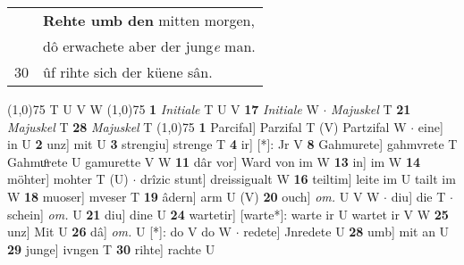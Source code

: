 \documentclass[8pt,a4paper,notitlepage]{article}
\begin{document}
\begin{table}[ht]
\begin{minipage}[t]{0.5\linewidth}
\begin{tabular}{rl}
 & \textbf{Rehte umb den} mitten morgen,\\ 
 & dô erwachete aber der jung\textit{e} man.\\ 
30 & ûf rihte sich der küene sân.\\ 
\end{tabular}
\scriptsize
\line(1,0){75} \newline
T U V W \newline
\line(1,0){75} \newline
\textbf{1} \textit{Initiale} T U V  \textbf{17} \textit{Initiale} W   $\cdot$ \textit{Majuskel} T  \textbf{21} \textit{Majuskel} T  \textbf{28} \textit{Majuskel} T  \newline
\line(1,0){75} \newline
\textbf{1} Parcifal] Parzifal T (V) Partzifal W  $\cdot$ eine] in U \textbf{2} unz] mit U \textbf{3} strengiu] strenge T \textbf{4} ir] [*]: Jr V \textbf{8} Gahmurete] gahmvrete T Gahmuͦrete U gamurette V W \textbf{11} dâr vor] Ward von im W \textbf{13} in] im W \textbf{14} möhter] mohter T (U)  $\cdot$ drîzic stunt] dreissigualt W \textbf{16} teiltim] leite im U tailt im W \textbf{18} muoser] mveser T \textbf{19} âdern] arm U (V) \textbf{20} ouch] \textit{om.} U V W  $\cdot$ diu] die T  $\cdot$ schein] \textit{om.} U \textbf{21} diu] dine U \textbf{24} wartetir] [warte*]: warte ir U wartet ir V W \textbf{25} unz] Mit U \textbf{26} dâ] \textit{om.} U [*]: do V do W  $\cdot$ redete] Jnredete U \textbf{28} umb] mit an U \textbf{29} junge] ivngen T \textbf{30} rihte] rachte U \newline
\end{minipage}
\end{table}
\end{document}
